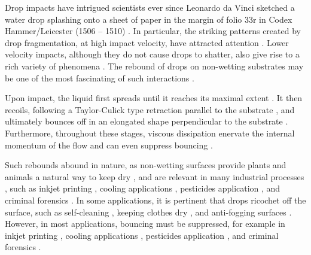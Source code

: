 Drop impacts have intrigued scientists ever since Leonardo da Vinci sketched a water drop splashing onto a sheet of paper in the margin of folio 33r in Codex Hammer/Leicester (1506 -- 1510) \citep{da1508notebooks}. In particular, the striking patterns created by drop fragmentation, at high impact velocity, have attracted attention \citep{rein1993phenomena, yarin2006drop, villermaux2011drop, kim2020raindrop}. 
Lower velocity impacts, although they do not cause drops to shatter, also give rise to a rich variety of phenomena \citep{worthington1877xxviii, worthington1877second, chandra1991collision, thoroddsen2008high, yarin2006drop, josserand2016drop}.
The rebound of drops on non-wetting substrates may be one of the most fascinating of such interactions \citep{richard2000bouncing, richard2002contact, tsai2009drop}.

Upon impact, the liquid first spreads \citep{philippi2016, Gordillo2018} until it reaches its maximal extent \citep{clanet2004,laan2014maximum,wildeman2016spreading,gordillo2019theory}. 
It then recoils, following a Taylor-Culick type retraction parallel to the substrate \citep{taylor-1959-procrsoclonda, culick-1960-japplphys, bartolo2005retraction, pierson2020revisiting, deka2020revisiting, sanjay2022taylor}, and ultimately bounces off in an elongated shape perpendicular to the substrate \citep{richard2000bouncing, yarin2006drop, josserand2016drop}. Furthermore, throughout these stages, viscous dissipation enervate the internal momentum of the flow and can even suppress bouncing \citep{wildeman2016spreading, jha2020viscous, ramirez2020lifting}.

Such rebounds abound in nature, as non-wetting surfaces provide plants and animals a natural way to keep dry \citep{neinhuis1997characterization, quere2008wetting}, and are relevant in many industrial processes \citep{yarin2017}, such as inkjet printing \cite{lohse2022fundamental}, cooling applications \cite{kim2007spray, shiri2017heat, jowkar2019rebounding}, pesticides application \cite{he2021optimization, hoffman2021controlling}, and criminal forensics \cite{smith2018influence}. In some applications, it is pertinent that drops ricochet off the surface, such as self-cleaning \citep{blossey2003self}, keeping clothes dry \citep{liu2008hydrophobic}, and anti-fogging surfaces \citep{mouterde2017antifogging}. 
However, in most applications, bouncing must be suppressed, for example in inkjet printing \citep{lohse2022fundamental}, cooling applications \citep{kim2007spray, shiri2017heat, jowkar2019rebounding}, pesticides application \citep{he2021optimization}, and criminal forensics \citep{smith2018influence}. 

